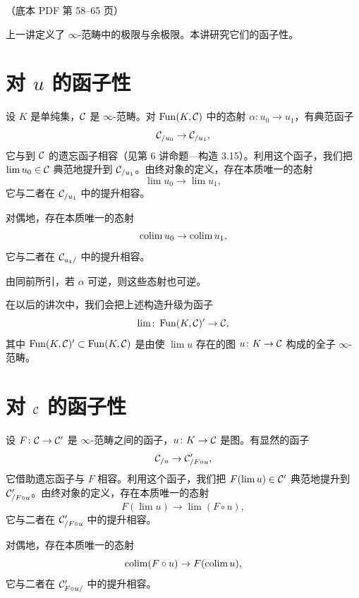 \begin{center}\small\color{black!55}（底本 PDF 第 58–65 页）\end{center}

上一讲定义了 $\infty$-范畴中的极限与余极限。本讲研究它们的函子性。

\section{对 $u$ 的函子性}

\begin{construction}\label{L7-1.1}
设 $K$ 是单纯集，$\mathcal{C}$ 是 $\infty$-范畴。对 $\operatorname{Fun}(K,\mathcal{C})$ 中的态射 $\alpha\colon u_0\to u_1$，有典范函子
\[
\mathcal{C}_{/u_0}\to\mathcal{C}_{/u_1},
\]
它与到 $\mathcal{C}$ 的遗忘函子相容（见第 6 讲命题—构造 3.15）。利用这个函子，我们把 $\lim u_0\in\mathcal{C}$ 典范地提升到 $\mathcal{C}_{/u_1}$。由终对象的定义，存在本质唯一的态射
\[
\lim u_0\to\lim u_1,
\]
它与二者在 $\mathcal{C}_{/u_1}$ 中的提升相容。

对偶地，存在本质唯一的态射
\[
\operatorname{colim} u_0\to\operatorname{colim} u_1,
\]
它与二者在 $\mathcal{C}_{u_1/}$ 中的提升相容。

由同前所引，若 $\alpha$ 可逆，则这些态射也可逆。
\end{construction}

\nitem\label{L7-1.2} 在以后的讲次中，我们会把上述构造升级为函子
\[
\lim\colon\operatorname{Fun}(K,\mathcal{C})'\to\mathcal{C},
\]
其中 $\operatorname{Fun}(K,\mathcal{C})'\subset\operatorname{Fun}(K,\mathcal{C})$ 是由使 $\lim u$ 存在的图 $u\colon K\to\mathcal{C}$ 构成的全子 $\infty$-范畴。

\section{对 $\mathcal{C}$ 的函子性}

\begin{construction}\label{L7-2.1}
设 $F\colon\mathcal{C}\to\mathcal{C}'$ 是 $\infty$-范畴之间的函子，$u\colon K\to\mathcal{C}$ 是图。有显然的函子
\[
\mathcal{C}_{/u}\to\mathcal{C}'_{/F\circ u},
\]
它借助遗忘函子与 $F$ 相容。利用这个函子，我们把 $F(\lim u)\in\mathcal{C}'$ 典范地提升到 $\mathcal{C}'_{/F\circ u}$。由终对象的定义，存在本质唯一的态射
\[
F(\lim u)\to\lim(F\circ u),
\]
它与二者在 $\mathcal{C}'_{/F\circ u}$ 中的提升相容。

对偶地，存在本质唯一的态射
\[
\operatorname{colim}(F\circ u)\to F(\operatorname{colim} u),
\]
它与二者在 $\mathcal{C}'_{F\circ u/}$ 中的提升相容。
\end{construction}

